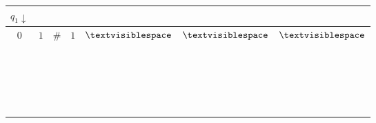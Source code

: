 \documentclass[12pt, oneside]{article}
\begin{document}
\begin{tabular}{|c|c|c|c|c|c|c|}
\hline
\multicolumn{1}{|c}{$q_1\downarrow$} &  \multicolumn{6}{c|}{\phantom{A}}\\
\hline
$0$ & $1$  & $\#$  & $1$ & $\textvisiblespace $& $\textvisiblespace $&  $\textvisiblespace $\\
\hline
\multicolumn{7}{|c|}{\phantom{A}}\\
\hline
\phantom{AA} & \phantom{AA}& \phantom{AA}& \phantom{AA}& \phantom{AA}& \phantom{AA}& \phantom{AA} \\
\hline
\multicolumn{7}{|c|}{\phantom{A}}\\
\hline
\phantom{AA} & \phantom{AA}& \phantom{AA}& \phantom{AA}& \phantom{AA}& \phantom{AA}& \phantom{AA} \\
\hline
\multicolumn{7}{|c|}{\phantom{A}}\\
\hline
\phantom{AA} & \phantom{AA}& \phantom{AA}& \phantom{AA}& \phantom{AA}& \phantom{AA}& \phantom{AA} \\
\hline
\multicolumn{7}{|c|}{\phantom{A}}\\
\hline
\phantom{AA} & \phantom{AA}& \phantom{AA}& \phantom{AA}& \phantom{AA}& \phantom{AA}& \phantom{AA} \\
\hline
\multicolumn{7}{|c|}{\phantom{A}}\\
\hline
\phantom{AA} & \phantom{AA}& \phantom{AA}& \phantom{AA}& \phantom{AA}& \phantom{AA}& \phantom{AA} \\
\hline
\multicolumn{7}{|c|}{\phantom{A}}\\
\hline
\phantom{AA} & \phantom{AA}& \phantom{AA}& \phantom{AA}& \phantom{AA}& \phantom{AA}& \phantom{AA} \\
\hline
\multicolumn{7}{|c|}{\phantom{A}}\\
\hline
\phantom{AA} & \phantom{AA}& \phantom{AA}& \phantom{AA}& \phantom{AA}& \phantom{AA}& \phantom{AA} \\
\hline
\multicolumn{7}{|c|}{\phantom{A}}\\
\hline
\phantom{AA} & \phantom{AA}& \phantom{AA}& \phantom{AA}& \phantom{AA}& \phantom{AA}& \phantom{AA} \\
\hline
\multicolumn{7}{|c|}{\phantom{A}}\\
\hline
\phantom{AA} & \phantom{AA}& \phantom{AA}& \phantom{AA}& \phantom{AA}& \phantom{AA}& \phantom{AA} \\
\hline
\multicolumn{7}{|c|}{\phantom{A}}\\
\hline
\phantom{AA} & \phantom{AA}& \phantom{AA}& \phantom{AA}& \phantom{AA}& \phantom{AA}& \phantom{AA} \\

\end{tabular}
\end{document}
